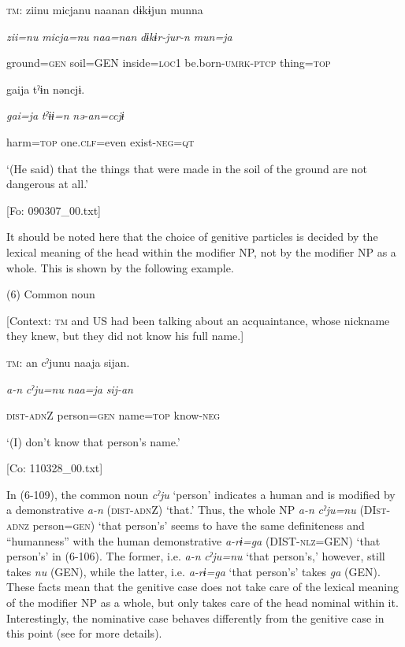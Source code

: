     \textsc{tm}:  ziinu  micjanu  naanan  dɨkɨjun  munna

      \textit{zii=nu}  \textit{micja=nu}  \textit{naa=nan}  \textit{dɨkɨr-jur-n}  \textit{mun=ja}

      ground=\textsc{gen}  soil=GEN  inside=\textsc{loc}1  be.born-\textsc{umrk}-\textsc{ptcp}  thing=\textsc{top}

      gaija  tˀɨn  nəncjɨ.

      \textit{gai=ja}  \textit{tˀɨɨ=n}  \textit{nə-an=ccjɨ}

      harm=\textsc{top}  one.\textsc{clf}=even  exist-\textsc{neg}=\textsc{qt}

      ‘(He said) that the things that were made in the soil of the ground are not dangerous at all.’

      [Fo: 090307\_00.txt]

It should be noted here that the choice of genitive particles is decided by the lexical meaning of the head within the modifier NP, not by the modifier NP as a whole. This is shown by the following example.

(6)  Common noun

  [Context: \textsc{tm} and US had been talking about an acquaintance, whose nickname they knew, but they did not know his full name.]

  \textsc{tm}:  an  cˀjunu  naaja  sijan.

    \textit{a-n}  \textit{cˀju=nu}  \textit{naa=ja}  \textit{sij-an}

    \textsc{dist}-\textsc{adn}Z  person=\textsc{gen}  name=\textsc{top}  know-\textsc{neg}

    ‘(I) don’t know that person’s name.’

    [Co: 110328\_00.txt]

In (6-109), the common noun \textit{cˀju} ‘person’ indicates a human and is modified by a demonstrative \textit{a-n} (\textsc{dist}-\textsc{adn}Z) ‘that.’ Thus, the whole NP \textit{a-n} \textit{cˀju=nu} (DI\textsc{st}-\textsc{adnz} person=\textsc{gen}) ‘that person’s’ seems to have the same definiteness and “humanness” with the human demonstrative \textit{a-rɨ=ga} (DIST-\textsc{nlz}=GEN) ‘that person’s’ in (6-106). The former, i.e. \textit{a-n} \textit{cˀju=nu} ‘that person’s,’ however, still takes \textit{nu} (GEN), while the latter, i.e. \textit{a-rɨ=ga} ‘that person’s’ takes \textit{ga} (GEN). These facts mean that the genitive case does not take care of the lexical meaning of the modifier NP as a whole, but only takes care of the head nominal within it. Interestingly, the nominative case behaves differently from the genitive case in this point (see  for more details).

